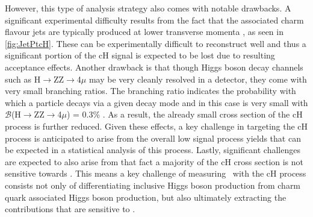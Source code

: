 However, this type of analysis strategy also comes with notable drawbacks. A significant experimental difficulty results from the fact that the associated charm flavour jets are typically produced at lower transverse momenta \pt, as seen in \autoref{fig:JetPtcH}. These can be experimentally difficult to reconstruct well and thus a significant portion of the cH signal is expected to be lost due to resulting acceptance effects. Another drawback is that though Higgs boson decay channels such as H$\rightarrow$ZZ$\rightarrow$4$\mu$ may be very cleanly resolved in a detector, they come with very small branching ratios. The branching ratio indicates the probability with which a particle decays via a given decay mode and in this case is very small with $\mathcal{B}$(H$\rightarrow$ZZ$\rightarrow$4$\mu$) =  0.3\% \cite{PhysRevD.110.030001}. As a result, the already small cross section of the cH process is further reduced. Given these effects, a key challenge in targeting the cH process is anticipated to arise from the overall low signal process yields that can be expected in a statistical analysis of this process. Lastly, significant challenges are expected to also arise from that fact a majority of the cH cross section is not sensitive towards \yc. This means a key challenge of measuring \yc\, with the cH process consists not only of differentiating inclusive Higgs boson production from charm quark associated Higgs boson production, but also ultimately extracting the contributions that are sensitive to \yc.\\
\\
